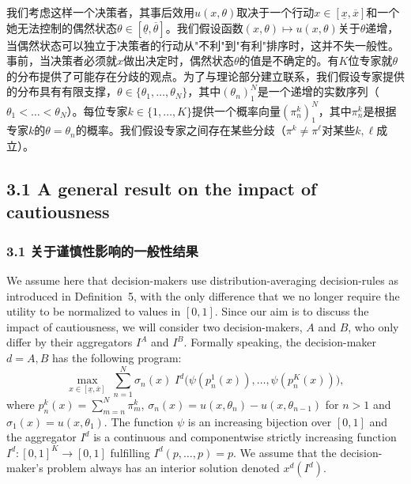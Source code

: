 \documentclass[12pt,a4paper]{article}
\newenvironment{original}
  {\par\noindent\ignorespaces}
  {\par}
\newenvironment{translation}
  {\par\noindent{\color{transblue}\ignorespaces}}
  {\par\medskip}
\begin{document}
\begin{translation}
我们考虑这样一个决策者，其事后效用$u(x, \theta)$取决于一个行动$x \in [\underline{x}, \overline{x}]$和一个她无法控制的偶然状态$\theta \in [\underline{\theta}, \overline{\theta}]$。我们假设函数$(x, \theta) \mapsto u(x, \theta)$关于$\theta$递增，当偶然状态可以独立于决策者的行动从"不利"到"有利"排序时，这并不失一般性。事前，当决策者必须就$x$做出决定时，偶然状态$\theta$的值是不确定的。有$K$位专家就$\theta$的分布提供了可能存在分歧的观点。为了与理论部分建立联系，我们假设专家提供的分布具有有限支撑，$\theta \in \{\theta_{1}, \dots, \theta_{N}\}$，其中$(\theta_{n})_{1}^{N}$是一个递增的实数序列（$\theta_{1} < \dots < \theta_{N}$）。每位专家$k \in \{1, \dots, K\}$提供一个概率向量$(\pi^{k}_{n})_{1}^{N}$，其中$\pi^{k}_{n}$是根据专家$k$的$\theta = \theta_{n}$的概率。我们假设专家之间存在某些分歧（$\pi^{k} \neq \pi^{\ell}$对某些$k, \ell$成立）。
\end{translation}

\subsection{3.1 A general result on the impact of cautiousness}
{\color{transblue}\subsubsection*{3.1 关于谨慎性影响的一般性结果}}

\begin{original}
We assume here that decision-makers use distribution-averaging decision-rules as introduced in Definition~5, with the only difference that we no longer require the utility to be normalized to values in $[0,1]$. Since our aim is to discuss the impact of cautiousness, we will consider two decision-makers, $A$ and $B$, who only differ by their aggregators $I^{A}$ and $I^{B}$. Formally speaking, the decision-maker $d = A, B$ has the following program:
\[
\max_{x \in [\underline{x}, \overline{x}]} \; \sum_{n=1}^{N} \sigma_{n}(x) \; I^{d}\!\big(\psi(p^{1}_{n}(x)), \dots, \psi(p^{K}_{n}(x))\big), \tag{9}
\]
where $p^{k}_{n}(x) = \sum_{m=n}^{N} \pi^{k}_{m}$, $\sigma_{n}(x) = u(x, \theta_{n}) - u(x, \theta_{n-1})$ for $n > 1$ and $\sigma_{1}(x) = u(x, \theta_{1})$. The function $\psi$ is an increasing bijection over $[0,1]$ and the aggregator $I^{d}$ is a continuous and componentwise strictly increasing function $I^{d}: [0,1]^{K} \to [0,1]$ fulfilling $I^{d}(p, \dots, p) = p$. We assume that the decision-maker's problem always has an interior solution denoted $x^{d}(I^{d})$.
\end{original}
\end{document}
